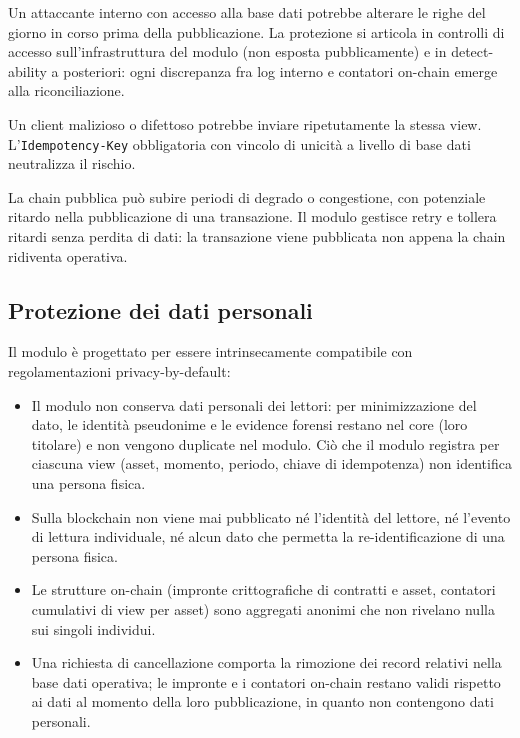 \documentclass[a4paper,11pt]{article}
\begin{document}
\begin{description}[leftmargin=0.5cm, itemsep=0.2em]
\item[Manomissione del log prima del batching.] Un attaccante interno con accesso alla base dati potrebbe alterare le righe del giorno in corso prima della pubblicazione. La protezione si articola in controlli di accesso sull'infrastruttura del modulo (non esposta pubblicamente) e in detect-ability a posteriori: ogni discrepanza fra log interno e contatori on-chain emerge alla riconciliazione.

\item[Replay di richieste.] Un client malizioso o difettoso potrebbe inviare ripetutamente la stessa view. L'\texttt{Idempotency-Key} obbligatoria con vincolo di unicit\`a a livello di base dati neutralizza il rischio.

\item[Affidabilit\`a della chain.] La chain pubblica pu\`o subire periodi di degrado o congestione, con potenziale ritardo nella pubblicazione di una transazione. Il modulo gestisce retry e tollera ritardi senza perdita di dati: la transazione viene pubblicata non appena la chain ridiventa operativa.
\end{description}

\subsection{Protezione dei dati personali}

Il modulo \`e progettato per essere intrinsecamente compatibile con regolamentazioni privacy-by-default:

\begin{itemize}[leftmargin=*, itemsep=0.1em]
    \item Il modulo non conserva dati personali dei lettori: per minimizzazione del dato, le identit\`a pseudonime e le evidence forensi restano nel core (loro titolare) e non vengono duplicate nel modulo. Ci\`o che il modulo registra per ciascuna view (asset, momento, periodo, chiave di idempotenza) non identifica una persona fisica.
    \item Sulla blockchain non viene mai pubblicato n\'e l'identit\`a del lettore, n\'e l'evento di lettura individuale, n\'e alcun dato che permetta la re-identificazione di una persona fisica.
    \item Le strutture on-chain (impronte crittografiche di contratti e asset, contatori cumulativi di view per asset) sono aggregati anonimi che non rivelano nulla sui singoli individui.
    \item Una richiesta di cancellazione comporta la rimozione dei record relativi nella base dati operativa; le impronte e i contatori on-chain restano validi rispetto ai dati al momento della loro pubblicazione, in quanto non contengono dati personali.
\end{itemize}
\end{document}
